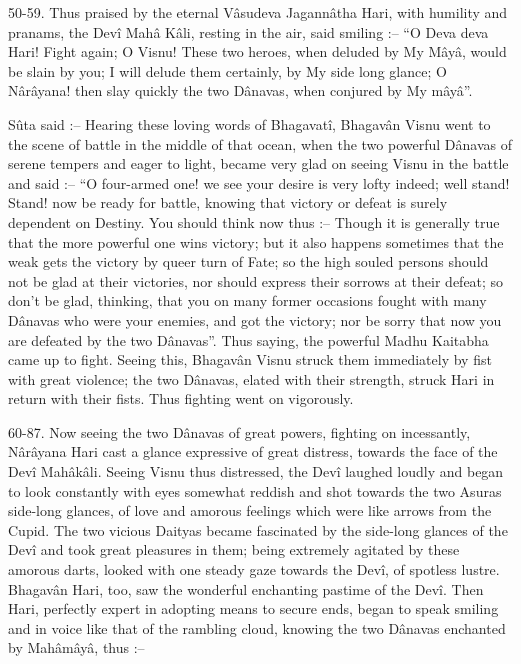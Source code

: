 50-59. Thus praised by the eternal V\^asudeva Jagann\^atha Hari, with humility and pranams, the Dev\^i Mah\^a K\^ali, resting in the air, said smiling :-- ``O Deva deva Hari! Fight again; O Visnu! These two heroes, when deluded by My M\^ay\^a, would be slain by you; I will delude them certainly, by My side long glance; O N\^ar\^ayana! then slay quickly the two D\^anavas, when conjured by My m\^ay\^a''.

S\^uta said :-- Hearing these loving words of Bhagavat\^i, Bhagav\^an Visnu went to the scene of battle in the middle of that ocean, when the two powerful D\^anavas of serene tempers and eager to light, became very glad on seeing Visnu in the battle and said :-- ``O four-armed one! we see your desire is very lofty indeed; well  stand! Stand! now be ready for battle, knowing that victory or defeat is surely dependent on Destiny. You should think now thus :-- Though it is generally true that the more powerful one wins victory; but it also happens sometimes that the weak gets the victory by queer turn of Fate; so the high souled persons should not be glad at their victories, nor should express their sorrows at their defeat; so don’t be glad, thinking, that you on many former occasions fought with many D\^anavas who were your enemies, and got the victory; nor be sorry that now you are defeated by the two D\^anavas''. Thus saying, the powerful Madhu Kaitabha came up to fight. Seeing this, Bhagav\^an Visnu struck them immediately by fist with great violence; the two D\^anavas, elated with their strength, struck Hari in return with their fists. Thus fighting went on vigorously.

60-87. Now seeing the two D\^anavas of great powers, fighting on incessantly, N\^ar\^ayana Hari cast a glance expressive of great distress, towards the face of the Dev\^i Mah\^ak\^ali. Seeing Visnu thus distressed, the Dev\^i laughed loudly and began to look constantly with eyes somewhat reddish and shot towards the two Asuras side-long glances, of love and amorous feelings which were like arrows from the Cupid. The two vicious Daityas became fascinated by the side-long glances of the Dev\^i and took great pleasures in them; being extremely agitated by these amorous darts, looked with one steady gaze towards the Dev\^i, of spotless lustre. Bhagav\^an Hari, too, saw the wonderful enchanting pastime of the Dev\^i. Then Hari, perfectly expert in adopting means to secure ends, began to speak smiling and in voice like that of the rambling cloud, knowing the two D\^anavas enchanted by Mah\^am\^ay\^a, thus :--

